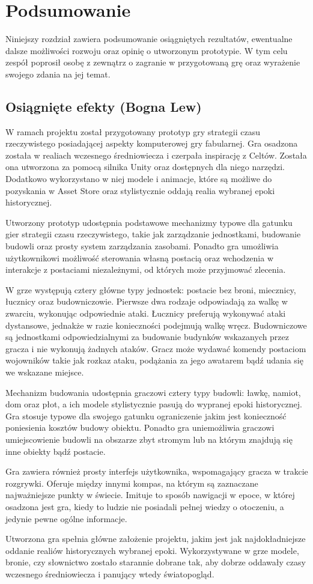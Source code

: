 \chapter{Podsumowanie}\label{chap:summary}
Niniejszy rozdział zawiera podsumowanie osiągniętych rezultatów, ewentualne dalsze możliwości rozwoju oraz opinię o
utworzonym prototypie. W tym celu zespół poprosił osobę z zewnątrz o zagranie w przygotowaną grę oraz wyrażenie swojego
zdania na jej temat.

\section{Osiągnięte efekty (Bogna Lew)}
W ramach projektu został przygotowany prototyp gry strategii czasu rzeczywistego posiadającej aspekty komputerowej gry
fabularnej. Gra osadzona została w realiach wczesnego średniowiecza i czerpała inspirację z Celtów. Została ona
utworzona za pomocą silnika Unity oraz dostępnych dla niego narzędzi. Dodatkowo wykorzystano w niej modele i animacje,
które są możliwe do pozyskania w Asset Store oraz stylistycznie oddają realia wybranej epoki historycznej.

Utworzony prototyp udostępnia podstawowe mechanizmy typowe dla gatunku gier strategii czasu rzeczywistego, takie jak
zarządzanie jednostkami, budowanie budowli oraz prosty system zarządzania zasobami. Ponadto gra umożliwia użytkownikowi
możliwość sterowania własną postacią oraz wchodzenia w interakcje z postaciami niezależnymi, od których może przyjmować
zlecenia.

W grze występują cztery główne typy jednostek: postacie bez broni, miecznicy, łucznicy oraz budowniczowie. Pierwsze dwa
rodzaje odpowiadają za walkę w zwarciu, wykonując odpowiednie ataki. Łucznicy preferują wykonywać ataki dystansowe,
jednakże w razie konieczności podejmują walkę wręcz. Budowniczowe są jednostkami odpowiedzialnymi za budowanie budynków
wskazanych przez gracza i nie wykonują żadnych ataków. Gracz może wydawać komendy postaciom wojowników takie jak rozkaz
ataku, podążania za jego awatarem bądź udania się we wskazane miejsce.

Mechanizm budowania udostępnia graczowi cztery typy budowli: ławkę, namiot, dom oraz płot, a ich modele stylistycznie
pasują do wypranej epoki historycznej. Gra stosuje typowe dla swojego gatunku ograniczenie jakim jest konieczność
poniesienia kosztów budowy obiektu. Ponadto gra uniemożliwia graczowi umiejscowienie budowli na obszarze zbyt stromym
lub na którym znajdują się inne obiekty bądź postacie.

Gra zawiera również prosty interfejs użytkownika, wspomagający gracza w trakcie rozgrywki. Oferuje między innymi kompas,
na którym są zaznaczane najważniejsze punkty w świecie. Imituje to sposób nawigacji w epoce, w której osadzona jest gra,
kiedy to ludzie nie posiadali pełnej wiedzy o otoczeniu, a jedynie pewne ogólne informacje.

Utworzona gra spełnia główne założenie projektu, jakim jest jak najdokładniejsze oddanie realiów historycznych wybranej
epoki. Wykorzystywane w grze modele, bronie, czy słownictwo zostało starannie dobrane tak, aby dobrze oddawały
czasy wczesnego średniowiecza i panujący wtedy światopogląd.


